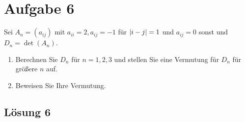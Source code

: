\documentclass[main.tex]{subfiles}
\begin{document}
\section{Aufgabe 6}
Sei $A_n=(a_{ij})$ mit $a_{ii} = 2, a_{ij} = -1$ für $\lvert i-j\rvert = 1$ und $a_{ij} = 0$ sonst und $D_n = \det(A_n)$. 
\begin{enumerate}
    \item Berechnen Sie $D_n$ für $n= 1, 2, 3$ und stellen Sie eine Vermutung für $D_n$ für größere $n$ auf.
    \item Beweisen Sie Ihre Vermutung.
\end{enumerate}

\subsection{Lösung 6}
\end{document}
